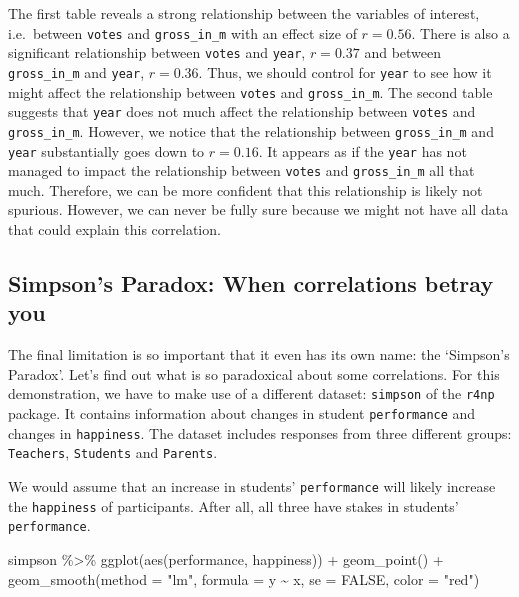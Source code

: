 \documentclass[
]{book}
\newenvironment{Shaded}{\begin{snugshade}}{\end{snugshade}}
\newcommand{\AttributeTok}[1]{\textcolor[rgb]{0.77,0.63,0.00}{#1}}
\newcommand{\ConstantTok}[1]{\textcolor[rgb]{0.00,0.00,0.00}{#1}}
\newcommand{\FunctionTok}[1]{\textcolor[rgb]{0.00,0.00,0.00}{#1}}
\newcommand{\NormalTok}[1]{#1}
\newcommand{\SpecialCharTok}[1]{\textcolor[rgb]{0.00,0.00,0.00}{#1}}
\newcommand{\StringTok}[1]{\textcolor[rgb]{0.31,0.60,0.02}{#1}}
\begin{document}
The first table reveals a strong relationship between the variables of interest, i.e.~between \texttt{votes} and \texttt{gross\_in\_m} with an effect size of \(r = 0.56\). There is also a significant relationship between \texttt{votes} and \texttt{year}, \(r = 0.37\) and between \texttt{gross\_in\_m} and \texttt{year}, \(r = 0.36\). Thus, we should control for \texttt{year} to see how it might affect the relationship between \texttt{votes} and \texttt{gross\_in\_m}. The second table suggests that \texttt{year} does not much affect the relationship between \texttt{votes} and \texttt{gross\_in\_m}. However, we notice that the relationship between \texttt{gross\_in\_m} and \texttt{year} substantially goes down to \(r = 0.16\). It appears as if the \texttt{year} has not managed to impact the relationship between \texttt{votes} and \texttt{gross\_in\_m} all that much. Therefore, we can be more confident that this relationship is likely not spurious. However, we can never be fully sure because we might not have all data that could explain this correlation.

\hypertarget{simpsons-paradox}{%
\subsection{Simpson's Paradox: When correlations betray you}\label{simpsons-paradox}}

The final limitation is so important that it even has its own name: the `Simpson's Paradox'. Let's find out what is so paradoxical about some correlations. For this demonstration, we have to make use of a different dataset: \texttt{simpson} of the \texttt{r4np} package. It contains information about changes in student \texttt{performance} and changes in \texttt{happiness}. The dataset includes responses from three different groups: \texttt{Teachers}, \texttt{Students} and \texttt{Parents}.

We would assume that an increase in students' \texttt{performance} will likely increase the \texttt{happiness} of participants. After all, all three have stakes in students' \texttt{performance}.

\begin{Shaded}
\begin{Highlighting}[]
\NormalTok{simpson }\SpecialCharTok{\%\textgreater{}\%} 
  \FunctionTok{ggplot}\NormalTok{(}\FunctionTok{aes}\NormalTok{(performance, happiness)) }\SpecialCharTok{+}
  \FunctionTok{geom\_point}\NormalTok{() }\SpecialCharTok{+}
  \FunctionTok{geom\_smooth}\NormalTok{(}\AttributeTok{method =} \StringTok{"lm"}\NormalTok{,}
              \AttributeTok{formula =}\NormalTok{ y }\SpecialCharTok{\textasciitilde{}}\NormalTok{ x,}
              \AttributeTok{se =} \ConstantTok{FALSE}\NormalTok{,}
              \AttributeTok{color =} \StringTok{"red"}\NormalTok{)}
\end{Highlighting}
\end{Shaded}
\end{document}

